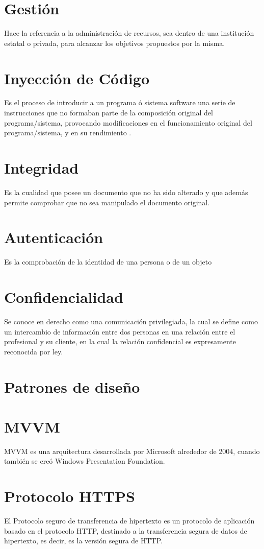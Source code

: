     \section{Gestión}
    Hace la referencia a la administración de recursos, sea dentro de una institución estatal o privada, para alcanzar los objetivos propuestos por la misma.
    \section{Inyección de Código}
     Es el proceso de introducir a un programa ó sistema software una serie de instrucciones que no formaban parte de la composición original del  programa/sistema, provocando modificaciones en el funcionamiento original del programa/sistema, y en su rendimiento .
    \section{Integridad}%
     Es la cualidad que posee un documento que no ha sido alterado y que además permite comprobar que no sea manipulado el documento original.
    \section{Autenticación}%
    Es la comprobación de la identidad de una persona o de un objeto
    \section{Confidencialidad}%
    Se conoce en derecho como una comunicación privilegiada, la cual se define como un intercambio de información entre dos personas en una relación entre el profesional y su cliente, en la cual la relación confidencial es expresamente reconocida por ley. 
    \section{Patrones de diseño}
    \section{MVVM}
    MVVM es una arquitectura desarrollada por Microsoft alrededor de 2004, cuando también se creó Windows Presentation Foundation.
    \section{Protocolo HTTPS}
    El Protocolo seguro de transferencia de hipertexto es un protocolo de aplicación basado en el protocolo HTTP, destinado a la transferencia segura de datos de hipertexto, es decir, es la versión segura de HTTP.
    
    
